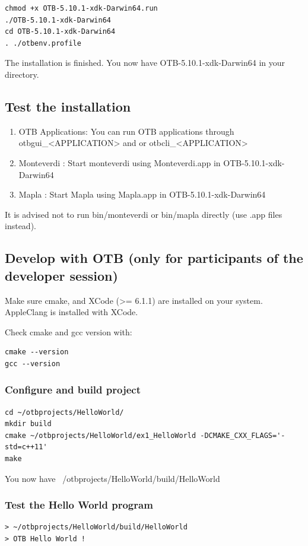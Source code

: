 \documentclass[10pt,a4paper]{article}
\begin{document}
\begin{verbatim}
chmod +x OTB-5.10.1-xdk-Darwin64.run
./OTB-5.10.1-xdk-Darwin64
cd OTB-5.10.1-xdk-Darwin64
. ./otbenv.profile
\end{verbatim}

The installation is finished. You now have OTB-5.10.1-xdk-Darwin64 in your
directory.

\subsection{Test the installation}

\begin{enumerate}
\item OTB Applications: You can run OTB applications through otbgui\_<APPLICATION> and or otbcli\_<APPLICATION> 
\item Monteverdi : Start monteverdi using Monteverdi.app in OTB-5.10.1-xdk-Darwin64
\item Mapla : Start Mapla using Mapla.app in OTB-5.10.1-xdk-Darwin64
\end{enumerate}
It is advised not to run bin/monteverdi or bin/mapla directly (use .app files instead).

\subsection{Develop with OTB (only for participants of the developer session)}
Make sure cmake, and XCode (>= 6.1.1) are installed on your system. AppleClang
is installed with XCode.

Check cmake and gcc version with:

\begin{verbatim}
cmake --version
gcc --version
\end{verbatim}

\subsubsection{Configure and build project}

\begin{verbatim}
cd ~/otbprojects/HelloWorld/
mkdir build
cmake ~/otbprojects/HelloWorld/ex1_HelloWorld -DCMAKE_CXX_FLAGS='-std=c++11'
make
\end{verbatim}

You now have ~/otbprojects/HelloWorld/build/HelloWorld

\subsubsection{Test the Hello World program}

\begin{verbatim}
> ~/otbprojects/HelloWorld/build/HelloWorld
> OTB Hello World !
\end{verbatim}
\end{document}
